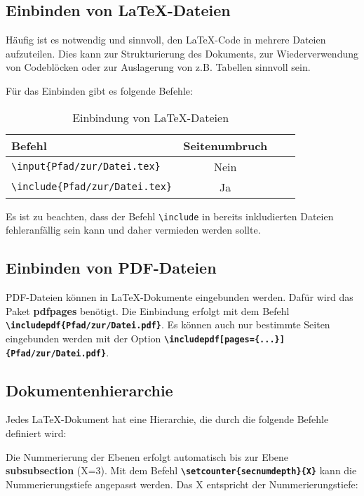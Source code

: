\subsection{Einbinden von \LaTeX{}-Dateien}
\label{sec:einbinden_von_latex_dateien}
Häufig ist es notwendig und sinnvoll, den \LaTeX{}-Code in mehrere Dateien aufzuteilen. Dies kann zur Strukturierung des Dokuments, zur Wiederverwendung von Codeblöcken oder zur Auslagerung von z.B. Tabellen sinnvoll sein.

Für das Einbinden gibt es folgende Befehle:
\begin{table}[H]
    \centering
    \begin{tabular}{lccc}
        \toprule
        \textbf{Befehl}                                       & \textbf{Seitenumbruch} \\
        \midrule
        \texttt{\textbackslash input\{Pfad/zur/Datei.tex\}}   & Nein                   \\
        \texttt{\textbackslash include\{Pfad/zur/Datei.tex\}} & Ja                     \\

        \bottomrule
    \end{tabular}
    \caption{Einbindung von \LaTeX{}-Dateien}
    \label{tab:latex_einbindung}
\end{table}

Es ist zu beachten, dass der Befehl \texttt{\textbackslash include} in bereits inkludierten Dateien fehleranfällig sein kann und daher vermieden werden sollte.


\subsection{Einbinden von PDF-Dateien}
\label{sec:einbinden_von_pdf_dateien}
PDF-Dateien können in \LaTeX{}-Dokumente eingebunden werden. Dafür wird das Paket \textbf{pdfpages} benötigt. Die Einbindung erfolgt mit dem Befehl \textbf{\texttt{\textbackslash includepdf\{Pfad/zur/Datei.pdf\}}}. Es können auch nur bestimmte Seiten eingebunden werden mit der Option \textbf{\texttt{\textbackslash includepdf[pages=\{...\}]\{Pfad/zur/Datei.pdf\}}}.


\subsection{Dokumentenhierarchie}
Jedes \LaTeX{}-Dokument hat eine Hierarchie, die durch die folgende Befehle definiert wird:


Die Nummerierung der Ebenen erfolgt automatisch bis zur Ebene \textbf{subsubsection} (X=3).
Mit dem Befehl \textbf{\texttt{\textbackslash setcounter\{secnumdepth\}\{X\}}} kann die Nummerierungstiefe angepasst werden. Das X entspricht der Nummerierungstiefe:


